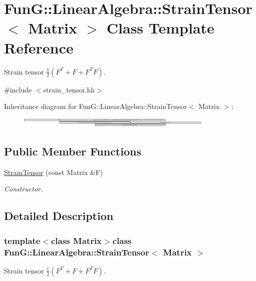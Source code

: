 \hypertarget{classFunG_1_1LinearAlgebra_1_1StrainTensor}{\section{Fun\-G\-:\-:Linear\-Algebra\-:\-:Strain\-Tensor$<$ Matrix $>$ Class Template Reference}
\label{classFunG_1_1LinearAlgebra_1_1StrainTensor}
}


Strain tensor $ \frac{1}{2}\left(F^T+F + F^T F\right) $.  




{\ttfamily \#include $<$strain\-\_\-tensor.\-hh$>$}

Inheritance diagram for Fun\-G\-:\-:Linear\-Algebra\-:\-:Strain\-Tensor$<$ Matrix $>$\-:\begin{figure}[H]
\begin{center}
\leavevmode
\includegraphics[height=0.457516cm]{classFunG_1_1LinearAlgebra_1_1StrainTensor}
\end{center}
\end{figure}
\subsection*{Public Member Functions}
\begin{DoxyCompactItemize}
\item 
\hyperlink{classFunG_1_1LinearAlgebra_1_1StrainTensor_a8286130595c1ee92c64c7fd491f78d4c}{Strain\-Tensor} (const Matrix \&F)
\begin{DoxyCompactList}\small\item\em Constructor. \end{DoxyCompactList}\end{DoxyCompactItemize}


\subsection{Detailed Description}
\subsubsection*{template$<$class Matrix$>$class Fun\-G\-::\-Linear\-Algebra\-::\-Strain\-Tensor$<$ Matrix $>$}

Strain tensor $ \frac{1}{2}\left(F^T+F + F^T F\right) $. 

